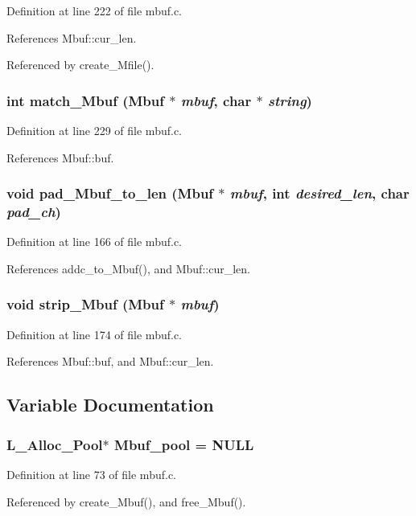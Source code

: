 Definition at line 222 of file mbuf.c.

References Mbuf::cur\_\-len.

Referenced by create\_\-Mfile().
\subsubsection{\setlength{\rightskip}{0pt plus 5cm}int match\_\-Mbuf (\bf{Mbuf} $\ast$ {\em mbuf}, char $\ast$ {\em string})}\label{mbuf_8c_eea3101e4e74dfac1f981eddb05a53cf}




Definition at line 229 of file mbuf.c.

References Mbuf::buf.
\subsubsection{\setlength{\rightskip}{0pt plus 5cm}void pad\_\-Mbuf\_\-to\_\-len (\bf{Mbuf} $\ast$ {\em mbuf}, int {\em desired\_\-len}, char {\em pad\_\-ch})}\label{mbuf_8c_36c7d7ed67081cd93a2e3a84af88ea34}




Definition at line 166 of file mbuf.c.

References addc\_\-to\_\-Mbuf(), and Mbuf::cur\_\-len.
\subsubsection{\setlength{\rightskip}{0pt plus 5cm}void strip\_\-Mbuf (\bf{Mbuf} $\ast$ {\em mbuf})}\label{mbuf_8c_4c99820608ec9edeb90d0d717252d3ca}




Definition at line 174 of file mbuf.c.

References Mbuf::buf, and Mbuf::cur\_\-len.

\subsection{Variable Documentation}
\subsubsection{\setlength{\rightskip}{0pt plus 5cm}\bf{L\_\-Alloc\_\-Pool}$\ast$ \bf{Mbuf\_\-pool} = NULL}\label{mbuf_8c_dbc02de02b86ec81b93cc0bcd7745aa9}




Definition at line 73 of file mbuf.c.

Referenced by create\_\-Mbuf(), and free\_\-Mbuf().